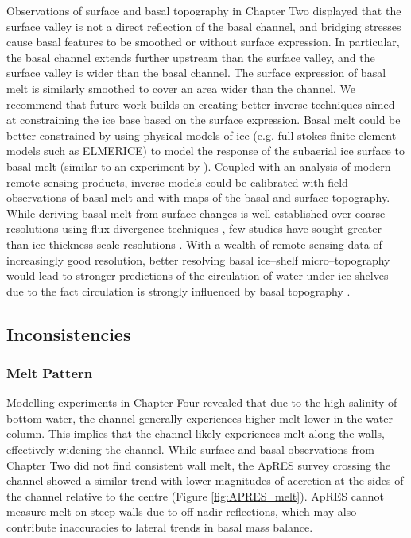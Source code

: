 Observations of surface and basal topography in Chapter Two displayed that the surface valley is not a direct reflection of the basal channel, and bridging stresses cause basal features to be smoothed or without surface expression. In particular, the basal channel extends further upstream than the surface valley, and the surface valley is wider than the basal channel. The surface expression of basal melt is similarly smoothed to cover an area wider than the channel. 
We recommend that future work builds on creating better inverse techniques aimed at constraining the ice base based on the surface expression. Basal melt could be better constrained by using physical models of ice (e.g. full stokes finite element models such as ELMERICE) to model the response of the subaerial ice surface to basal melt (similar to an experiment by \cite{drews2020atmospheric}). Coupled with an analysis of modern remote sensing products, inverse models could be calibrated with field observations of basal melt and with maps of the basal and surface topography.  While deriving basal melt from surface changes is well established over coarse resolutions using flux divergence techniques \citep{berger2017detecting}, few studies have sought greater than ice thickness scale resolutions \citep[e.g.][]{mankoff2012role}. With a wealth of remote sensing data of increasingly good resolution, better resolving basal ice--shelf micro--topography would lead to stronger predictions of the circulation of water under ice shelves due to the fact circulation is strongly influenced by basal topography \citep{holland2003ice}. 

\subsection{Inconsistencies}

\subsubsection{Melt Pattern}

Modelling experiments in Chapter Four revealed that due to the high salinity of bottom water, the channel generally experiences higher melt lower in the water column. This implies that the channel likely experiences melt along the walls, effectively widening the channel. While surface and basal observations from Chapter Two did not find consistent wall melt, the ApRES survey crossing the channel showed a similar trend with lower magnitudes of accretion at the sides of the channel relative to the centre (Figure \ref{fig:APRES_melt}). ApRES cannot measure melt on steep walls due to off nadir reflections, which may also contribute inaccuracies to lateral trends in basal mass balance.

